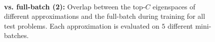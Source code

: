 \begin{figure}[p]
\vspace{3mm}

\textbf{\cifarhun \allcnnc \adam}\\[1mm]
\begin{minipage}{0.50\textwidth}
\centering
{}
\end{minipage}\hfill
\begin{minipage}{0.50\textwidth}
\centering
{}
\end{minipage}

\caption{\textbf{\bfvivit{} vs. full-batch \ggn (2):} Overlap between the top-$C$ eigenspaces of different \ggn approximations and the full-batch \ggn during training for all test problems.
Each approximation is evaluated on $5$ different mini-batches.}
\label{fig:vivit_vs_full_batch_ggn_2}
\end{figure}

